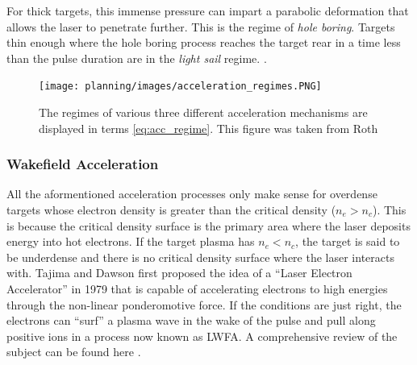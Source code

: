 For thick targets, this immense pressure can impart a parabolic deformation that allows the laser to penetrate further. This is the regime of \emph{hole boring}. Targets thin enough where the hole boring process reaches the target rear in a time less than the pulse duration are in the \emph{light sail} regime. \cite{Macchi_2013_RevModPhys}. 

\begin{figure}
	\centering 
	\texttt{[image: planning/images/acceleration\_regimes.PNG]}
	\caption{The regimes of various three different acceleration mechanisms are displayed in terms \cref{eq:acc_regime}. This figure was taken from Roth \cite{Lezhnin_2015_PoP}}
	\label{fig:regimes}
\end{figure}

\subsubsection{Wakefield Acceleration}
All the aformentioned acceleration processes only make sense for overdense targets whose electron density is greater than the critical density ($n_e > n_c$). This is because the critical density surface is the primary area where the laser deposits energy into hot electrons. If the target plasma has $n_e < n_c$, the target is said to be underdense and there is no critical density surface where the laser interacts with. Tajima and Dawson \cite{Tajima_1979_PRL} first proposed the idea of a ``Laser Electron Accelerator'' in 1979 that is capable of accelerating electrons to high energies through the non-linear ponderomotive force. If the conditions are just right, the electrons can ``surf'' a plasma wave in the wake of the pulse and pull along positive ions in a process now known as \gls{LWFA}. A comprehensive review of the subject can be found here \cite{Esarey_2009_LPA}.

